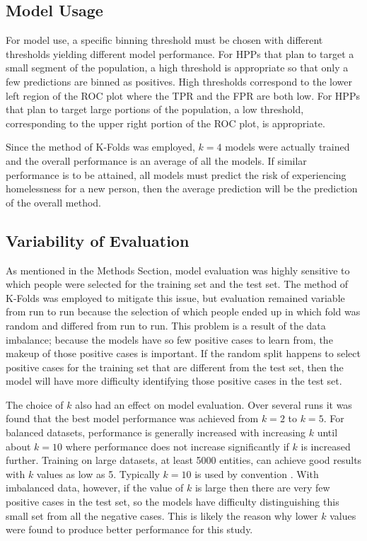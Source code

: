 \documentclass[10pt,letterpaper]{article}
\begin{document}
\subsection*{Model Usage}
For model use, a specific binning threshold must be chosen with different thresholds yielding different model performance. For HPPs that plan to target a small segment of the population, a high threshold is appropriate so that only a few predictions are binned as positives. High thresholds correspond to the lower left region of the ROC plot where the TPR and the FPR are both low. For HPPs that plan to target large portions of the population, a low threshold, corresponding to the upper right portion of the ROC plot, is appropriate. 

Since the method of K-Folds was employed, $k=4$ models were actually trained and the overall performance is an average of all the models. If similar performance is to be attained, all models must predict the risk of experiencing homelessness for a new person, then the average prediction will be the prediction of the overall method.

\subsection*{Variability of Evaluation}
As mentioned in the Methods Section, model evaluation was highly sensitive to which people were selected for the training set and the test set. The method of K-Folds was employed to mitigate this issue, but evaluation remained variable from run to run because the selection of which people ended up in which fold was random and differed from run to run. This problem is a result of the data imbalance; because the models have so few positive cases to learn from, the makeup of those positive cases is important. If the random split happens to select positive cases for the training set that are different from the test set, then the model will have more difficulty identifying those positive cases in the test set. 

The choice of $k$ also had an effect on model evaluation. Over several runs it was found that the best model performance was achieved from $k=2$ to $k=5$. For balanced datasets, performance is generally increased with increasing $k$ until about $k=10$ where performance does not increase significantly if $k$ is increased further. Training on large datasets, at least 5000 entities, can achieve good results with $k$ values as low as 5. Typically $k=10$ is used by convention \cite{marcot2020optimal}. With imbalanced data, however, if the value of $k$ is large then there are very few positive cases in the test set, so the models have difficulty distinguishing this small set from all the negative cases. This is likely the reason why lower $k$ values were found to produce better performance for this study.
\end{document}
